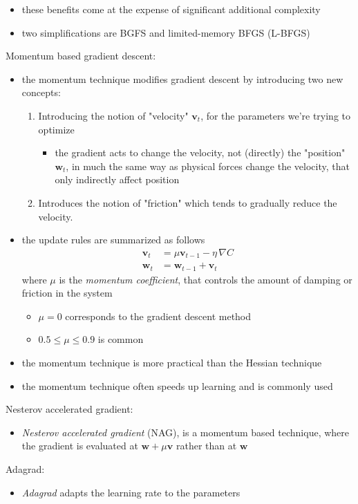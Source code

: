 \documentclass[onecolumn]{IEEEtran}
\newcommand{\beq}{\begin{equation}}
\newcommand{\eeq}{\end{equation}}
\newcommand{\bi}{\begin{itemize}}
\newcommand{\ei}{\end{itemize}}
\begin{document}
\begin{itemize}
        \item these benefits come at the expense of significant additional complexity
        \item two simplifications are BGFS and limited-memory BFGS (L-BFGS)
    \ei
    \item Momentum based gradient descent:
    \bi
        \item the momentum technique modifies gradient descent by introducing two new concepts:
        \begin{enumerate}
          \item Introducing the notion of "velocity" $\bm{v}_t$, for the parameters we're trying to optimize
          \bi
            \item the gradient acts to change the velocity, not (directly) the "position" $\bm{w}_t$, in much the same way as physical forces change the velocity, that only indirectly affect position
          \ei
          \item Introduces the notion of "friction" which tends to gradually reduce the velocity.
        \end{enumerate}
        \item the update rules are summarized as follows
        \beq\label{momentum}\begin{split}
               \bm{v}_t &= \mu \bm{v}_{t-1} - \eta \, \nabla C \\
               \bm{w}_t &= \bm{w}_{t-1} + \bm{v}_t
        \end{split}\eeq
        where $\mu$ is the \emph{momentum coefficient}, that controls the amount of damping or friction in the system
        \bi
            \item $\mu=0$ corresponds to the gradient descent method
            \item $0.5 \leq \mu \leq 0.9$ is common
        \ei
        \item the momentum technique is more practical than the Hessian technique
        \item the momentum technique often speeds up learning and is commonly used
    \ei
    \item Nesterov accelerated gradient:
    \bi
        \item \emph{Nesterov accelerated gradient} (NAG), is a momentum based technique, where the gradient is evaluated at $\bm{w} + \mu \bm{v}$ rather than at $\bm{w}$
    \ei
    \item Adagrad:
    \bi
        \item \emph{Adagrad} adapts the learning rate to the parameters

\end{itemize}
\end{document}

